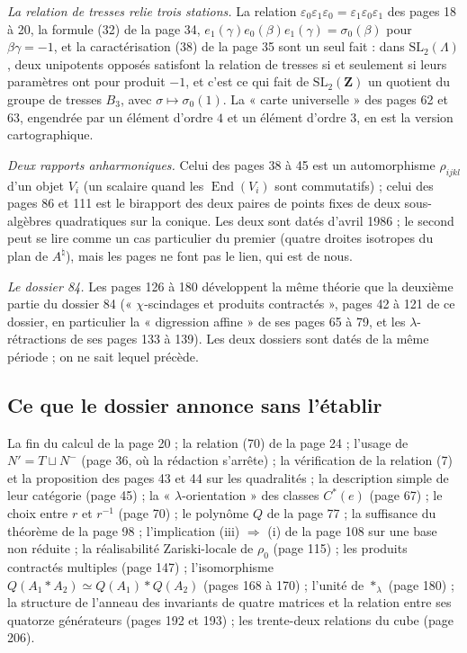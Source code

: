 \documentclass[11pt,a4paper]{article}
\begin{document}
\emph{La relation de tresses relie trois stations.} La relation
$\varepsilon_0\varepsilon_1\varepsilon_0 = \varepsilon_1\varepsilon_0\varepsilon_1$
des pages 18 à 20, la formule (32) de la page 34, $e_1(\gamma)e_0(\beta)e_1(\gamma)
= \sigma_0(\beta)$ pour $\beta\gamma = -1$, et la caractérisation (38) de la
page 35 sont un seul fait : dans $\mathrm{SL}_2(\Lambda)$, deux unipotents
opposés satisfont la relation de tresses si et seulement si leurs paramètres ont
pour produit $-1$, et c'est ce qui fait de $\mathrm{SL}_2(\mathbf{Z})$ un
quotient du groupe de tresses $B_3$, avec $\sigma \mapsto \sigma_0(1)$. La
« carte universelle » des pages 62 et 63, engendrée par un élément d'ordre $4$
et un élément d'ordre $3$, en est la version cartographique.

\emph{Deux rapports anharmoniques.} Celui des pages 38 à 45 est un
automorphisme $\rho_{ijkl}$ d'un objet $V_i$ (un scalaire quand les
$\operatorname{End}(V_i)$ sont commutatifs) ; celui des pages 86 et 111 est le
birapport des deux paires de points fixes de deux sous-algèbres quadratiques
sur la conique. Les deux sont datés d'avril 1986 ; le second peut se lire comme un cas
particulier du premier (quatre droites isotropes du plan de $A^{\natural}$), mais
les pages ne font pas le lien, qui est de nous.

\emph{Le dossier 84.} Les pages 126 à 180 développent la même théorie que la
deuxième partie du dossier 84 (« $\chi$-scindages et produits contractés »,
pages 42 à 121 de ce dossier, en particulier la « digression affine » de ses
pages 65 à 79, et les $\lambda$-rétractions de ses pages 133 à 139). Les deux
dossiers sont datés de la même période ; on ne sait lequel précède.

\subsection*{Ce que le dossier annonce sans l'établir}

La fin du calcul de la page 20 ; la relation (70) de la page 24 ; l'usage de
$N' = T \sqcup N^{-}$ (page 36, où la rédaction s'arrête) ; la vérification
de la relation (7) et la proposition des pages 43 et 44 sur les quadralités ;
la description simple de leur catégorie (page 45) ; la
« $\lambda$-orientation » des classes $C^{*}(e)$ (page 67) ; le choix entre
$r$ et $r^{-1}$ (page 70) ; le polynôme $Q$ de la page 77 ; la suffisance du
théorème de la page 98 ; l'implication (iii) $\Rightarrow$ (i) de la page 108
sur une base non réduite ; la réalisabilité Zariski-locale de $\rho_0$ (page
115) ; les produits contractés multiples (page 147) ; l'isomorphisme
$Q(A_1 * A_2) \simeq Q(A_1) * Q(A_2)$ (pages 168 à 170) ; l'unité de
$*_\lambda$ (page 180) ; la structure de l'anneau des invariants de quatre
matrices et la relation entre ses quatorze générateurs (pages 192 et 193) ; les
trente-deux relations du cube (page 206).
\end{document}

